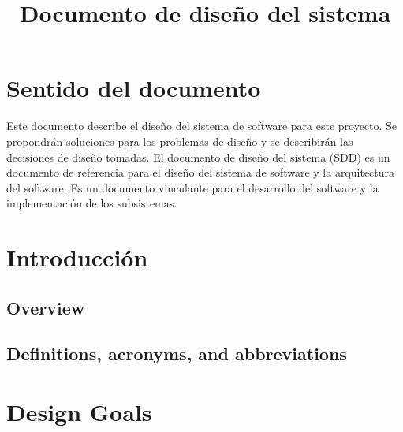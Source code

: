 \documentclass[a4paper,12pt]{article}
\makeatletter
\renewcommand{\maketitle}{\bgroup\setlength{\parindent}{0pt}
    \begin{flushleft}
    {\Huge\textbf{\@title}}
    \end{flushleft}\egroup
}
\makeatother
\begin{document}
    \title{Documento de diseño del sistema\\}
    \maketitle


    \section*{\color{black}Sentido del documento}

    Este documento describe el diseño del sistema de software para este proyecto.
    Se propondrán soluciones para los problemas de diseño y se describirán las decisiones de diseño tomadas.
    El documento de diseño del sistema (SDD) es un documento de referencia para el diseño del sistema de software y la arquitectura del software.
    Es un documento vinculante para el desarrollo del software y la implementación de los subsistemas.\autocite{identifier}

    \setcounter{tocdepth}{2}
    \tableofcontents

    \section{Introducción}\label{sec:introduccion}

    \subsection{Overview}

    \subsection{Definitions, acronyms, and abbreviations}

    \printbibliography



    \section{Design Goals}
\end{document}
